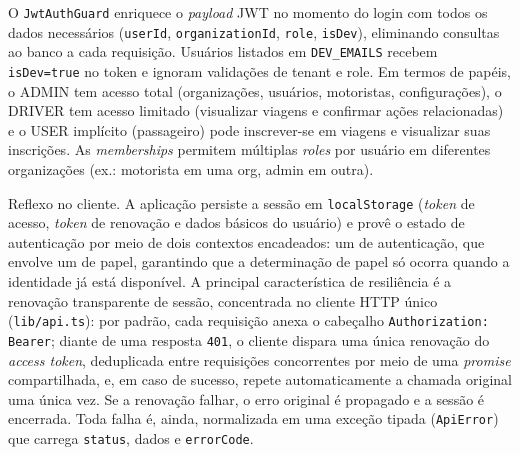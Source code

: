 O \texttt{JwtAuthGuard} enriquece o \textit{payload} JWT no momento do login com todos os dados necessários (\texttt{userId}, \texttt{organizationId}, \texttt{role}, \texttt{isDev}), eliminando consultas ao banco a cada requisição. Usuários listados em \texttt{DEV\_EMAILS} recebem \texttt{isDev=true} no token e ignoram validações de tenant e role. Em termos de papéis, o ADMIN tem acesso total (organizações, usuários, motoristas, configurações), o DRIVER tem acesso limitado (visualizar viagens e confirmar ações relacionadas) e o USER implícito (passageiro) pode inscrever-se em viagens e visualizar suas inscrições. As \textit{memberships} permitem múltiplas \textit{roles} por usuário em diferentes organizações (ex.: motorista em uma org, admin em outra).

Reflexo no cliente. A aplicação persiste a sessão em \texttt{localStorage} (\textit{token} de acesso, \textit{token} de renovação e dados básicos do usuário) e provê o estado de autenticação por meio de dois contextos encadeados: um de autenticação, que envolve um de papel, garantindo que a determinação de papel só ocorra quando a identidade já está disponível. A principal característica de resiliência é a renovação transparente de sessão, concentrada no cliente HTTP único (\texttt{lib/api.ts}): por padrão, cada requisição anexa o cabeçalho \texttt{Authorization: Bearer}; diante de uma resposta \texttt{401}, o cliente dispara uma única renovação do \textit{access token}, deduplicada entre requisições concorrentes por meio de uma \textit{promise} compartilhada, e, em caso de sucesso, repete automaticamente a chamada original uma única vez. Se a renovação falhar, o erro original é propagado e a sessão é encerrada. Toda falha é, ainda, normalizada em uma exceção tipada (\texttt{ApiError}) que carrega \texttt{status}, dados e \texttt{errorCode}.
